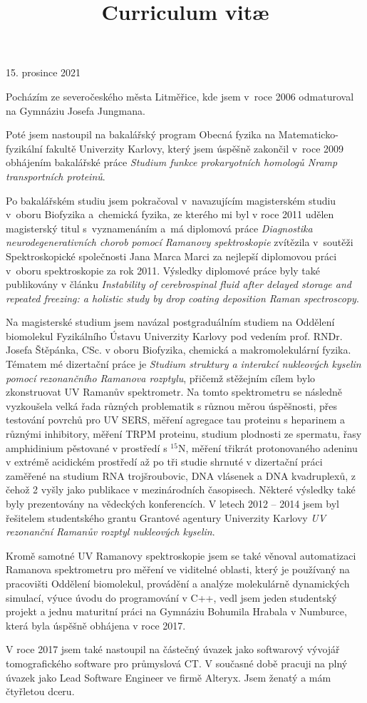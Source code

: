 \documentclass[12pt,sans]{moderncv}
\title{Curriculum vit\ae{}}
\begin{document}
\makecvtitle

\rmfamily
\hfill{}15. prosince 2021

\vspace{5mm}

\setlength{\parindent}{1.5em}

Pocházím ze severočeského města Litměřice, kde jsem v~roce 2006 odmaturoval na
Gymnáziu Josefa Jungmana.

Poté jsem nastoupil na bakalářský program Obecná fyzika na
Matematicko-fyzikální fakultě Univerzity Karlovy, který jsem úspěšně zakončil
v~roce 2009 obhájením bakalářské práce
\emph{Studium funkce prokaryotních homologů Nramp transportních proteinů}.

Po bakalářském studiu jsem pokračoval v~navazujícím magisterském studiu v~oboru
Biofyzika a~chemická fyzika, ze kterého mi byl v roce 2011 udělen magisterský
titul s~vyznamenáním a~má diplomová práce
\emph{Diagnostika neurodegenerativních chorob pomocí Ramanovy spektroskopie}
zvítězila v~soutěži Spektroskopické společnosti Jana Marca Marci za nejlepší
diplomovou práci v~oboru spektroskopie za rok 2011.
Výsledky diplomové práce byly také publikovány v článku
\emph{Instability of cerebrospinal fluid after delayed storage and repeated
freezing: a holistic study by drop coating deposition Raman spectroscopy}.

Na magisterské studium jsem navázal postgraduálním studiem na Oddělení
biomolekul Fyzikálního Ústavu Univerzity Karlovy pod vedením prof. RNDr. Josefa
Štěpánka, CSc. v oboru Biofyzika, chemická a makromolekulární fyzika.
Tématem mé dizertační práce je
\emph{Studium struktury a interakcí nukleových kyselin pomocí rezonančního
Ramanova rozptylu},
přičemž stěžejním cílem bylo zkonstruovat UV Ramanův spektrometr.
Na tomto spektrometru se následně vyzkoušela velká řada různých problematik
s různou měrou úspěšnosti,
	přes testování povrchů pro UV SERS,
	měření agregace tau proteinu s heparinem a různými inhibitory,
	měření TRPM proteinu,
	studium plodnosti ze spermatu,
	řasy amphidinium pěstované v prostředí s $^{15}$N,
	měření třikrát protonovaného adeninu v extrémě acidickém prostředí
až po tři studie shrnuté v dizertační práci zaměřené na studium
	RNA trojšroubovic,
	DNA vlásenek a
	DNA kvadruplexů,
z čehož 2 vyšly jako publikace v mezinárodních časopisech.
Některé výsledky také byly prezentovány na vědeckých konferencích.
V letech 2012 -- 2014 jsem byl řešitelem studentského grantu Grantové agentury
Univerzity Karlovy \emph{UV rezonanční Ramanův rozptyl nukleových kyselin}.

Kromě samotné UV Ramanovy spektroskopie jsem se také věnoval automatizaci
Ramanova spektrometru pro měření ve viditelné oblasti, který je používaný
na pracovišti Oddělení biomolekul, provádění a analýze molekulárně dynamických
simulací, výuce úvodu do programování v C++, vedl jsem jeden studentský projekt
a jednu maturitní práci na Gymnáziu Bohumila Hrabala v Numburce, která byla
úspěšně obhájena v roce 2017.

V roce 2017 jsem také nastoupil na částečný úvazek jako softwarový vývojář
tomografického software pro průmyslová CT.
V současné době pracuji na plný úvazek jako Lead Software Engineer ve firmě
Alteryx.
Jsem ženatý a mám čtyřletou dceru.
\end{document}
